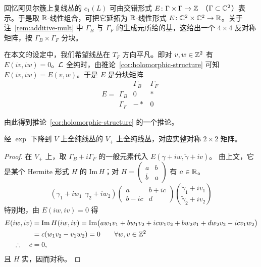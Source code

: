 \begin{example}\label{ex:alternating-form}
回忆阿贝尔簇上复线丛的 $c_1(L)$ 可由交错形式 $E\colon\Gamma\times\Gamma\to\mathbb{Z}$
（$\Gamma\subset\mathbb{C}^2$）表示。于是取 $\mathbb{R}$-线性组合，可把它延拓为 $\mathbb{R}$-线性形式
$E\colon\mathbb{C}^2\times\mathbb{C}^2\to\mathbb{R}$。关于注~\ref{rem:additive-mult} 中 $\Gamma_B$ 与
$\Gamma_F$ 的生成元所给的基，这给出一个 $4\times4$ 反对称矩阵，按
$\Gamma_B\times\Gamma_F$ 分块。

在本文的设定中，我们希望线丛在 $T_F$ 方向平凡。即对 $v,w\in\mathbb{Z}^2$ 有
$E(iv,iw)=0$。$\mathcal{L}$ 全纯时，由推论~\ref{cor:holomorphic-structure} 可知
$E(iv,iw)=E(v,w)$。于是 $E$ 是分块矩阵
\[
E=\begin{array}{c|cc}
 & \Gamma_B & \Gamma_F\\\hline
\Gamma_B & 0 & *\\
\Gamma_F & -* & 0
\end{array}
\]
\end{example}


由此得到推论~\ref{cor:holomorphic-structure} 的一个推论。

\begin{corollary}\label{cor:symmetric-matrix}
经 $\exp$ 下降到 $V$ 上全纯线丛的 $V_+$ 上全纯线丛，对应实整对称 $2\times2$ 矩阵。
\end{corollary}

\begin{proof}
在 $V_+$ 上，取 $\Gamma_B+i\Gamma_F$ 的一般元素代入 $E(\gamma+iw,\tilde\gamma+iv)$。
由上文，它是某个 Hermite 形式 $H$ 的 $\mathrm{Im}\,H$；对
$H=\begin{pmatrix}a&b\\ \bar b&a\end{pmatrix}$ 有 $a\in\mathbb{R}$。
\begin{equation}\label{eq:1-6}
(\gamma_1+iw_1\ \ \gamma_2+iw_2)
\begin{pmatrix} a & b+ic\\ b-ic & d\end{pmatrix}
\binom{\tilde\gamma_1+iv_1}{\tilde\gamma_2+iv_2}
\end{equation}
特别地，由 $E(iw,iv)=0$ 得
\begin{align*}
E(iw,iv) &= \mathrm{Im}\,H(iw,iv)
 = \mathrm{Im}\bigl(aw_1v_1+bw_1v_2+icw_1v_2+bw_2v_1+dw_2v_2-icv_1w_2\bigr)\\
 &= c(w_1v_2-v_1w_2)=0\qquad\forall w,v\in\mathbb{Z}^2\\
\therefore\quad c &= 0,
\end{align*}
且 $H$ 实，因而对称。\qedhere
\end{proof}

